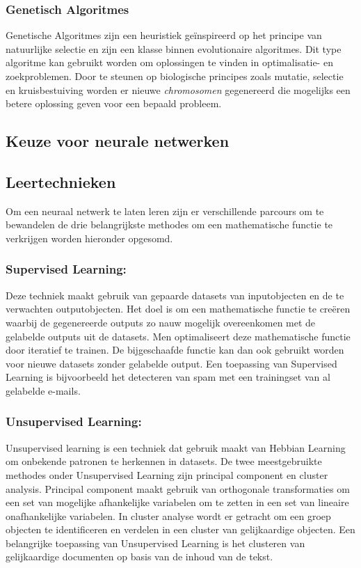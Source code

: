 	\subsubsection{Genetisch Algoritmes}
	Genetische Algoritmes zijn een heuristiek ge\"inspireerd op het principe van natuurlijke selectie en zijn een klasse binnen evolutionaire algoritmes. Dit type algoritme kan gebruikt worden om oplossingen te vinden in optimalisatie- en zoekproblemen. Door te steunen op biologische principes zoals mutatie, selectie en kruisbestuiving worden er nieuwe \textit{chromosomen} gegenereerd die mogelijks een betere oplossing geven voor een bepaald probleem.
\subsection{Keuze voor neurale netwerken }	
\subsection{Leertechnieken}
Om een neuraal netwerk te laten leren zijn er verschillende parcours om te bewandelen de drie belangrijkste methodes om een mathematische functie te verkrijgen worden hieronder opgesomd.


	\subsubsection{Supervised Learning:} Deze techniek maakt gebruik van gepaarde datasets van inputobjecten en de te verwachten outputobjecten. Het doel is om een mathematische functie te cre\"eren waarbij de gegenereerde outputs zo nauw mogelijk overeenkomen met de gelabelde outputs uit de datasets. Men optimaliseert deze mathematische functie door iteratief te trainen. De bijgeschaafde functie kan dan ook gebruikt worden voor nieuwe datasets zonder gelabelde output. Een toepassing van Supervised Learning is bijvoorbeeld het detecteren van spam met een trainingset van al gelabelde e-mails.
	
	\subsubsection{Unsupervised Learning:} Unsupervised learning is een techniek dat gebruik maakt van Hebbian Learning om onbekende patronen te herkennen in datasets. De twee meestgebruikte methodes onder Unsupervised Learning zijn principal component en cluster analysis. Principal component maakt gebruik van orthogonale transformaties om een set van mogelijke afhankelijke variabelen om te zetten in een set van lineaire onafhankelijke variabelen. In cluster analyse wordt er getracht om een groep objecten te identificeren en verdelen in een cluster van gelijkaardige objecten. 
	Een belangrijke toepassing van Unsupervised Learning is het clusteren van gelijkaardige documenten op basis van de inhoud van de tekst.
